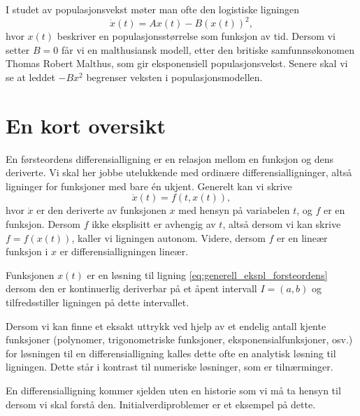 \documentclass{article}
\theoremstyle{plain}
\theoremstyle{definition}
\theoremstyle{remark}
\newenvironment{defn}
{\pushQED{\qed}\renewcommand{\qedsymbol}{$\triangle$}\defnx}
{\popQED\enddefnx}
\newenvironment{ex}
{\pushQED{\qed}\renewcommand{\qedsymbol}{$\triangle$}\exx}
{\popQED\endexx}
\newcommand{\fcn}{x}
\begin{document}
\begin{ex} \label{eks:populasjon_1}
    I studet av populasjonsvekst møter man ofte den logistiske ligningen
    \begin{equation*}
        \dot{\fcn}(t) = A \fcn(t) - B (\fcn(t))^2,
    \end{equation*}
    hvor $\fcn(t)$ beskriver en populasjonsstørrelse som funksjon av tid. Dersom vi setter $B = 0$ får vi en malthusiansk modell, etter den britiske samfunnsøkonomen Thomas Robert Malthus, som gir eksponensiell populasjonsvekst. Senere skal vi se at leddet $-B \fcn^2$ begrenser veksten i populasjonsmodellen.
\end{ex}


\section*{En kort oversikt}

En førsteordens differensialligning er en relasjon mellom en funksjon og dens deriverte. Vi skal her jobbe utelukkende med ordinære differensialligninger, altså ligninger for funksjoner med bare én ukjent. Generelt kan vi skrive
\begin{equation} \label{eq:generell_ekspl_forsteordens}
    \dot{\fcn}(t) = f(t, \fcn(t)),
\end{equation}
hvor $\dot{\fcn}$ er den deriverte av funksjonen $\fcn$ med hensyn på variabelen $t$, og $f$ er en funksjon. Dersom $f$ ikke eksplisitt er avhengig av $t$, altså dersom vi kan skrive $f = f(\fcn(t))$, kaller vi ligningen autonom. Videre, dersom $f$ er en lineær funksjon i $\fcn$ er differensialligningen lineær.

\begin{defn}
    Funksjonen $\fcn(t)$ er en løsning til ligning \eqref{eq:generell_ekspl_forsteordens} dersom den er kontinuerlig deriverbar på et åpent intervall $I = (a, b)$ og tilfredsstiller ligningen på dette intervallet.
\end{defn}

Dersom vi kan finne et eksakt uttrykk ved hjelp av et endelig antall kjente funksjoner (polynomer, trigonometriske funksjoner, eksponensialfunksjoner, osv.) for løsningen til en differensialligning kalles dette ofte en analytisk løsning til ligningen. Dette står i kontrast til numeriske løsninger, som er tilnærminger.

En differensialligning kommer sjelden uten en historie som vi må ta hensyn til dersom vi skal forstå den. Initialverdiproblemer er et eksempel på dette.
\end{document}
